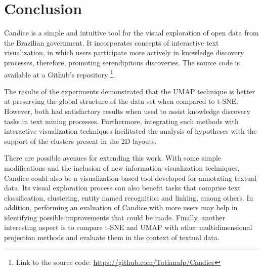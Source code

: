 \documentclass[conference]{IEEEtran}
\begin{document}
\section{Conclusion}

Candice is a simple and intuitive tool for the visual exploration of open data from the Brazilian government. It incorporates concepts of interactive text visualization, in which users participate more actively in knowledge discovery processes, therefore, promoting serendipitous discoveries. The source code is available at a Github's repository \footnote{Link to the source code: \url{https://github.com/Tatianafp/Candice}}.

The results of the experiments demonstrated that the UMAP technique is better at preserving the global structure of the data set when compared to t-SNE. However, both had satisfactory results when used to assist knowledge discovery tasks in text mining processes. Furthermore, integrating such methods with interactive visualization techniques facilitated the analysis of hypotheses with the support of the clusters present in the 2D layouts.

There are possible avenues for extending this work. With some simple modifications and the inclusion of new information visualization techniques, Candice could also be a visualization-based tool developed for annotating textual data. Its visual exploration process can also benefit tasks that comprise text classification, clustering, entity named recognition and linking, among others. In addition, performing an evaluation of Candice with more users may help in identifying possible improvements that could be made. Finally, another interesting aspect is to compare t-SNE and UMAP with other multidimensional projection methods and evaluate them in the context of textual data. 
\end{document}
